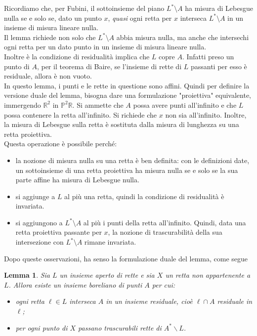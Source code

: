 \documentclass[a4paper, twoside,openright]{article}
\newcommand{\R}{\mathbb{R}}
\renewcommand{\P}{\mathbb{P}}
\newcommand{\<}{\langle}
\renewcommand{\>}{\rangle}
\newtheorem{lemma}[teo]{Lemma}
\begin{document}
Ricordiamo che, per Fubini, il sottoinsieme del piano $L^* \setminus A$ ha misura di Lebesgue nulla se e solo se, dato un punto $x$, \emph{quasi} ogni retta per $x$ interseca $L^* \setminus A$ in un insieme di misura lineare nulla.\\
Il lemma richiede non solo che $L^* \setminus A$ abbia misura nulla, ma anche che intersechi ogni retta per un dato punto in un insieme di misura lineare nulla. \\
Inoltre è la condizione di residualità implica che $L$ copre $A$. Infatti preso un punto di $A$, per il teorema di Baire, se l'insieme di rette di $L$ passanti per esso è residuale, allora è non vuoto.\\

In questo lemma, i punti e le rette in questione sono affini. Quindi per definire la versione duale del lemma, bisogna dare una formulazione "proiettiva" equivalente, immergendo $\R^2$ in $\P^2\R$. Si ammette che $A$ possa avere punti all'infinito e che $L$ possa contenere la retta all'infinito. Si richiede che $x$ non sia all'infinito. Inoltre, la misura di Lebesgue sulla retta è sostituta dalla misura di lunghezza su una retta proiettiva.\\
Questa operazione è possibile perché:
\begin{itemize}
	\item la nozione di misura nulla su una retta è ben definita: con le definizioni date, un sottoinsieme di una retta proiettiva ha misura nulla se e solo se la sua parte affine ha misura di Lebesgue nulla. 
	\item si aggiunge a $L$ al più una retta, quindi la condizione di residualità è invariata.
	\item si aggiungono a $L^* \setminus A$ al più i punti della retta all'infinito. Quindi, data una retta proiettiva passante per $x$, la nozione di trascurabilità della sua intersezione con $L^* \setminus A$ rimane invariata.
\end{itemize}
Dopo queste osservazioni, ha senso la formulazione duale del lemma, come segue 

\begin{lemma} \label{lemma2}
Sia $L$ un insieme aperto di rette e sia $X$ un retta non appartenente a $L$. Allora esiste un insieme boreliano di punti $A$ per cui:

\begin{itemize}
	\item ogni retta $\ell \in L$ interseca $A$ in un insieme residuale, cioè $\ell \cap A$ residuale in $\ell$;
	\item per ogni punto di $X$ passano trascurabili rette di $A^{*} \backslash L$.
\end{itemize}
\end{lemma}
\end{document}

